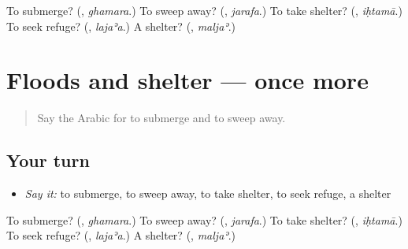 \begin{tcolorbox}[breakable,colback=teal!4,colframe=teal!35!black,title={Before you move on}]
To submerge? (\textbf{}, \emph{ghamara}.) To sweep away? (\textbf{}, \emph{jarafa}.) To take shelter? (\textbf{}, \emph{iḥtamā}.) To seek refuge? (\textbf{}, \emph{lajaʾa}.) A shelter? (\textbf{}, \emph{maljaʾ}.)
\end{tcolorbox}
\section[(dialogue)]{Floods and shelter — once more}

\label{lesson:AR-R487-review-final-487}



\begin{quote}
Say the Arabic for to submerge and to sweep away.
\end{quote}

\subsection*{Your turn}
\begin{itemize}
\raggedright
  \item \emph{Say it:} to submerge, to sweep away, to take shelter, to seek refuge, a shelter
\end{itemize}

\begin{tcolorbox}[breakable,colback=teal!4,colframe=teal!35!black,title={Before you move on}]
To submerge? (\textbf{}, \emph{ghamara}.) To sweep away? (\textbf{}, \emph{jarafa}.) To take shelter? (\textbf{}, \emph{iḥtamā}.) To seek refuge? (\textbf{}, \emph{lajaʾa}.) A shelter? (\textbf{}, \emph{maljaʾ}.)
\end{tcolorbox}
